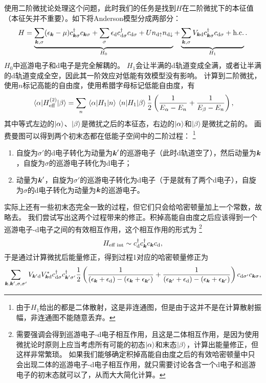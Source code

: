 使用二阶微扰论处理这个问题，此时我们的任务是找到${H}$在二阶微扰下的本征值（本征矢并不重要）。如下将Anderson模型分成两部分：
\[
    {H} = \underbrace{\sum_{\vb*{k}, \sigma} (\epsilon_{\vb*{k}} - \mu) {c}_{\vb*{k}\sigma}^\dagger {c}_{\vb*{k} \sigma} + \sum_\sigma \epsilon_\text{d} {c}_{\text{d}\sigma}^\dagger {c}_{\text{d} \sigma} + U {n}_{\text{d} \uparrow} {n}_{\text{d} \downarrow}}_{{H}_0} + \underbrace{\sum_{\vb*{k}, \sigma} V_{\vb*{k} \text{d}} {c}_{\vb*{k} \sigma}^\dagger {c}_{\text{d} \sigma} + \text{h.c.}}_{{H}_1}.
\]
${H}_0$中巡游电子和d电子是完全解耦的。
${H}_1$会让半满的d轨道变成全满，或者让半满的d轨道变成全空，因此其一阶效应对低能有效模型没有影响。
计算到二阶微扰，使用$n$标记高能的自由度，使用希腊字母标记低能自由度，有
\[
    \mel{\alpha}{{H}_\text{eff}^{(2)}}{\beta} = \sum_n \mel{\alpha}{{H}_1}{n} \mel{n}{{H}_1}{\beta} \frac{1}{2} \left( \frac{1}{E_\alpha - E_n} + \frac{1}{E_\beta - E_n} \right),
\]
其中等式左边的$\ket{\alpha}$、$\ket{\beta}$是微扰之后的本征态，右边的$\ket{\alpha}$和$\ket{\beta}$是微扰之前的。
画费曼图可以得到两个初末态都在低能子空间中的二阶过程：%
\footnote{由于${H}_1$给出的都是二体散射，这是非连通图，但是由于这并不是在计算散射振幅，非连通图不能随意丢弃。}%
\begin{enumerate}
    \item 自旋为$\sigma'$的d电子转化为动量为$\vb*{k}'$的巡游电子（此时d轨道空了），然后动量为$\vb*{k}$，自旋为$\sigma$的巡游电子转化为d电子；
    \item 动量为$\vb*{k}'$，自旋为$\sigma'$的巡游电子转化为d电子（于是就有了两个d电子），自旋为$\sigma$的d电子转化为动量为$\vb*{k}$的巡游电子。
\end{enumerate}
实际上还有一些初末态完全一致的过程，但它们只会给哈密顿量加上一个常数，故略去。
我们尝试写出这两个过程带来的修正。积掉高能自由度之后应该得到一个巡游电子-d电子之间的有效相互作用，这个相互作用的形式为%
\footnote{需要强调会得到巡游电子-d电子相互作用，且这是二体相互作用，是因为使用微扰论时原则上应当考虑所有可能的初态$\ket{\alpha}$和末态$\ket{\beta}$，计算出能量修正，但这样非常繁琐。
如果我们能够确定积掉高能自由度之后的有效哈密顿量中只会出现二体的巡游电子-d电子相互作用，就只需要讨论各含一个d电子和巡游电子的初末态就可以了，从而大大简化计算。
}%
\[
    {H}_\text{eff int} \sim {c}^\dagger_{\text{d}} {c}^\dagger_{\vb*{k}} {c}_{\vb*{k}} {c}_{\text{d}},
\]
于是通过计算微扰后能量修正，得到过程1对应的哈密顿量修正为
\[
    \sum_{\vb*{k}, \vb*{k}', \sigma, \sigma'} V_{\vb*{k}' \text{d}} V^*_{\vb*{k} \text{d}} 
    {c}_{\text{d} \sigma}^\dagger {c}^\dagger_{\vb*{k}' \sigma'} 
    \frac{1}{2} \left( 
        \frac{1}{(\epsilon_{\vb*{k}} + \epsilon_\text{d}) - (\epsilon_{\vb*{k}} + \epsilon_{\vb*{k}'})} + \frac{1}{(\epsilon_{\vb*{k}'} + \epsilon_\text{d}) - (\epsilon_{\vb*{k}} + \epsilon_{\vb*{k}'})} 
    \right)
    {c}_{\text{d} \sigma'} {c}_{\vb*{k} \sigma} ,
\]
